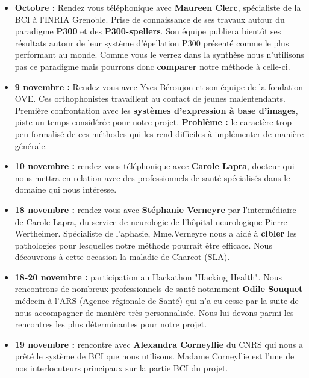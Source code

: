 \documentclass[11pt,a4paper]{article}
\theoremstyle{plain}
\theoremstyle{definition}
\begin{document}
\begin{itemize}
        \item \textbf{Octobre : } Rendez vous téléphonique avec \textbf{Maureen Clerc}, spécialiste de la BCI à l'INRIA Grenoble. Prise de connaissance de ses travaux autour du paradigme \textbf{P300} et des \textbf{P300-spellers}. Son équipe publiera bientôt ses résultats autour de leur système d'épellation P300 présenté comme le plus performant au monde. Comme vous le verrez dans la synthèse nous n'utilisons pas ce paradigme mais pourrons donc \textbf{comparer} notre méthode à celle-ci. \\
        \item \textbf{9 novembre : } Rendez vous avec Yves Béroujon et son équipe de la fondation OVE. Ces orthophonistes travaillent au contact de jeunes malentendants. Première confrontation avec les \textbf{systèmes d'expression à base d'images}, piste un temps considérée pour notre projet.  \textbf{Problème :} le caractère trop peu formalisé de ces méthodes qui les rend difficiles à implémenter de manière générale. \\
        \item \textbf{10 novembre : } rendez-vous téléphonique avec \textbf{Carole Lapra}, docteur qui nous mettra en relation avec des professionnels de santé spécialisés dans le domaine qui nous intéresse. \\
        \item \textbf{18 novembre : } rendez vous avec \textbf{Stéphanie Verneyre} par l'intermédiaire de Carole Lapra, du service de neurologie de l'hôpital neurologique Pierre Wertheimer. Spécialiste de l'aphasie, Mme.Verneyre nous a aidé à \textbf{cibler} les pathologies pour lesquelles notre méthode pourrait être efficace. Nous découvrons à cette occasion la maladie de Charcot (SLA). \\
        \item \textbf{18-20 novembre : } participation au Hackathon "Hacking Health". Nous rencontrons de nombreux professionnels de santé notamment \textbf{Odile Souquet} médecin à l'ARS (Agence régionale de Santé) qui n'a eu cesse par la suite de nous accompagner de manière très personnalisée. Nous lui devons parmi les rencontres les plus déterminantes pour notre projet. \\
        \item \textbf{19 novembre : } rencontre avec \textbf{Alexandra Corneyllie} du CNRS qui nous a prêté le système de BCI que nous utilisons. Madame Corneyllie est l'une de nos interlocuteurs principaux sur la partie BCI du projet. \\ 

\end{itemize}
\end{document}

